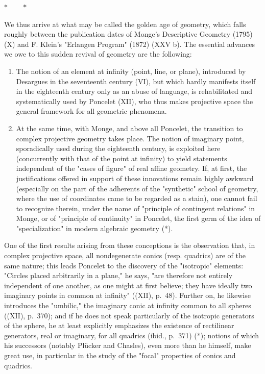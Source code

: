 \begin{center}
\(\ast\qquad\ast\)
\end{center}

We thus arrive at what may be called the golden age of geometry, which falls roughly between the publication dates of Monge's Descriptive Geometry (1795) (X) and F. Klein's "Erlangen Program" (1872) (XXV b). The essential advances we owe to this sudden revival of geometry are the following:

\begin{enumerate}
\def\labelenumi{\Alph{enumi})}
\item
  The notion of an element at infinity (point, line, or plane), introduced by Desargues in the seventeenth century (VI), but which hardly manifests itself in the eighteenth century only as an abuse of language, is rehabilitated and systematically used by Poncelet (XII), who thus makes projective space the general framework for all geometric phenomena.
\item
  At the same time, with Monge, and above all Poncelet, the transition to complex projective geometry takes place. The notion of imaginary point, sporadically used during the eighteenth century, is exploited here (concurrently with that of the point at infinity) to yield statements independent of the "cases of figure" of real affine geometry. If, at first, the justifications offered in support of these innovations remain highly awkward (especially on the part of the adherents of the "synthetic" school of geometry, where the use of coordinates came to be regarded as a stain), one cannot fail to recognize therein, under the name of "principle of contingent relations" in Monge, or of "principle of continuity" in Poncelet, the first germ of the idea of "specialization" in modern algebraic geometry (*).
\end{enumerate}

One of the first results arising from these conceptions is the observation that, in complex projective space, all nondegenerate conics (resp. quadrics) are of the same nature; this leads Poncelet to the discovery of the "isotropic" elements: "Circles placed arbitrarily in a plane," he says, "are therefore not entirely independent of one another, as one might at first believe; they have ideally two imaginary points in common at infinity" ((XII), p.~48). Further on, he likewise introduces the "umbilic," the imaginary conic at infinity common to all spheres ((XII), p.~370); and if he does not speak particularly of the isotropic generators of the sphere, he at least explicitly emphasizes the existence of rectilinear generators, real or imaginary, for all quadrics (ibid., p.~371) (*); notions of which his successors (notably Plücker and Chasles), even more than he himself, make great use, in particular in the study of the "focal" properties of conics and quadrics.

